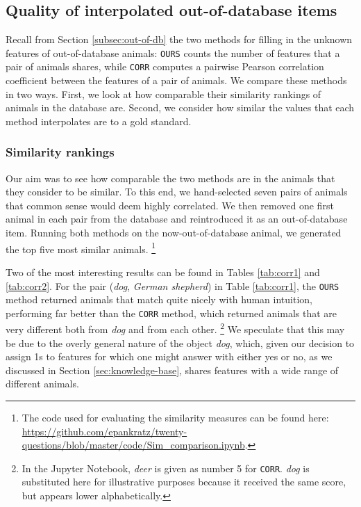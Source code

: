 \documentclass[11pt,a4paper]{article}
\begin{document}
\subsection{Quality of interpolated out-of-database items}
\label{subsec:eval-interpolation}

Recall from Section \ref{subsec:out-of-db} the two methods for filling in the unknown features of out-of-database animals: \texttt{OURS} counts the number of features that a pair of animals shares, while \texttt{CORR} computes a pairwise Pearson correlation coefficient between the features of a pair of animals.
We compare these methods in two ways.
First, we look at how comparable their similarity rankings of animals in the database are. 
Second, we consider how similar the values that each method interpolates are to a gold standard.

\subsubsection{Similarity rankings}

Our aim was to see how comparable the two methods are in the animals that they consider to be similar.
To this end, we hand-selected seven pairs of animals that common sense would deem highly correlated.
We then removed one first animal in each pair from the database and reintroduced it as an out-of-database item. 
Running both methods on the now-out-of-database animal, we generated the top five most similar animals.%
    \footnote{The code used for evaluating the similarity measures can be found here: \url{https://github.com/epankratz/twenty-questions/blob/master/code/Sim_comparison.ipynb}.}

Two of the most interesting results can be found in Tables \ref{tab:corr1} and \ref{tab:corr2}.
For the pair (\textit{dog}, \textit{German shepherd}) in Table \ref{tab:corr1}, the \texttt{OURS} method returned animals that match quite nicely with human intuition, performing far better than the \texttt{CORR} method, which returned animals that are very different both from \textit{dog} and from each other.%
    \footnote{In the Jupyter Notebook, \textit{deer} is given as number 5 for \texttt{CORR}.
    \textit{dog} is substituted here for illustrative purposes because it received the same score, but appears lower alphabetically.}
We speculate that this may be due to the overly general nature of the object \textit{dog}, which, given our decision to assign 1s to features for which one might answer with either yes or no, as we discussed in Section \ref{sec:knowledge-base}, shares features with a wide range of different animals.
\end{document}
